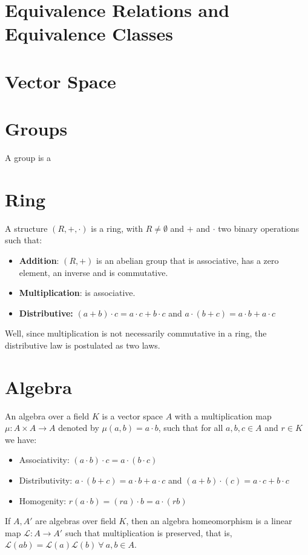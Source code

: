 \begin{appendices}
    \section{Equivalence Relations and Equivalence Classes}
    \section{Vector Space}
\section{Groups}
A group is a 
\section{Ring}
A structure $(R,+, \cdot)$ is a ring, with $R\neq \emptyset$ and $+$ and $\cdot$ two binary operations such that:
\begin{itemize}
    \item \textbf{Addition}: $(R,+)$ is an abelian group that is associative, has a zero element, an inverse and is commutative. 
    \item \textbf{Multiplication}: is associative.
    \item \textbf{Distributive: } $(a+b)\cdot c = a\cdot c + b\cdot c$ and $a\cdot (b+c) = a\cdot b + a\cdot c$
\end{itemize}
Well, since multiplication is not necessarily commutative in a ring, the distributive law is postulated as two laws.
\section{Algebra}
An algebra over a field $K$ is a vector space $A$ with a multiplication map $\mu : A\times A \rightarrow A$ denoted by $\mu(a,b) = a\cdot b$, such that for all $a,b,c\in A$ and $r\in K$ we have: 
\begin{itemize}
    \item Associativity: $(a\cdot b)\cdot c = a\cdot (b\cdot c)$ \\
    \item Distributivity: $a\cdot (b+c) = a\cdot b + a \cdot c$ and $(a+b)\cdot (c) = a\cdot c + b \cdot c$
    \item Homogenity: $r(a\cdot b) = (ra)\cdot b = a\cdot (rb)$
\end{itemize}
If $A,A'$ are algebras over field $K$, then an algebra homeomorphism is a linear map $\mathcal{L}: A\rightarrow A'$ such that multiplication is preserved, that is, $\mathcal{L}(ab) = \mathcal{L}(a)\mathcal{L}(b) \ \forall \ a,b \in A$. 
\end{appendices}
